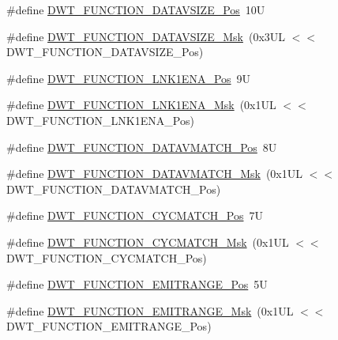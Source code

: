 \begin{DoxyCompactItemize}
\item 
\#define \hyperlink{group___c_m_s_i_s___d_w_t_ga0517a186d4d448aa6416440f40fe7a4d}{D\+W\+T\+\_\+\+F\+U\+N\+C\+T\+I\+O\+N\+\_\+\+D\+A\+T\+A\+V\+S\+I\+Z\+E\+\_\+\+Pos}~10U
\item 
\#define \hyperlink{group___c_m_s_i_s___d_w_t_gaab42cbc1e6084c44d5de70971613ea76}{D\+W\+T\+\_\+\+F\+U\+N\+C\+T\+I\+O\+N\+\_\+\+D\+A\+T\+A\+V\+S\+I\+Z\+E\+\_\+\+Msk}~(0x3\+U\+L $<$$<$ D\+W\+T\+\_\+\+F\+U\+N\+C\+T\+I\+O\+N\+\_\+\+D\+A\+T\+A\+V\+S\+I\+Z\+E\+\_\+\+Pos)
\item 
\#define \hyperlink{group___c_m_s_i_s___d_w_t_ga89d7c48858b4d4de96cdadfac91856a1}{D\+W\+T\+\_\+\+F\+U\+N\+C\+T\+I\+O\+N\+\_\+\+L\+N\+K1\+E\+N\+A\+\_\+\+Pos}~9U
\item 
\#define \hyperlink{group___c_m_s_i_s___d_w_t_ga64bd419260c3337cacf93607d1ad27ac}{D\+W\+T\+\_\+\+F\+U\+N\+C\+T\+I\+O\+N\+\_\+\+L\+N\+K1\+E\+N\+A\+\_\+\+Msk}~(0x1\+U\+L $<$$<$ D\+W\+T\+\_\+\+F\+U\+N\+C\+T\+I\+O\+N\+\_\+\+L\+N\+K1\+E\+N\+A\+\_\+\+Pos)
\item 
\#define \hyperlink{group___c_m_s_i_s___d_w_t_ga106f3672cd4be7c7c846e20497ebe5a6}{D\+W\+T\+\_\+\+F\+U\+N\+C\+T\+I\+O\+N\+\_\+\+D\+A\+T\+A\+V\+M\+A\+T\+C\+H\+\_\+\+Pos}~8U
\item 
\#define \hyperlink{group___c_m_s_i_s___d_w_t_ga32af1f1c0fcd2d8d9afd1ad79cd9970e}{D\+W\+T\+\_\+\+F\+U\+N\+C\+T\+I\+O\+N\+\_\+\+D\+A\+T\+A\+V\+M\+A\+T\+C\+H\+\_\+\+Msk}~(0x1\+U\+L $<$$<$ D\+W\+T\+\_\+\+F\+U\+N\+C\+T\+I\+O\+N\+\_\+\+D\+A\+T\+A\+V\+M\+A\+T\+C\+H\+\_\+\+Pos)
\item 
\#define \hyperlink{group___c_m_s_i_s___d_w_t_ga4b65d79ca37ae8010b4a726312413efd}{D\+W\+T\+\_\+\+F\+U\+N\+C\+T\+I\+O\+N\+\_\+\+C\+Y\+C\+M\+A\+T\+C\+H\+\_\+\+Pos}~7U
\item 
\#define \hyperlink{group___c_m_s_i_s___d_w_t_ga8e2ed09bdd33a8f7f7ce0444f5f3bb25}{D\+W\+T\+\_\+\+F\+U\+N\+C\+T\+I\+O\+N\+\_\+\+C\+Y\+C\+M\+A\+T\+C\+H\+\_\+\+Msk}~(0x1\+U\+L $<$$<$ D\+W\+T\+\_\+\+F\+U\+N\+C\+T\+I\+O\+N\+\_\+\+C\+Y\+C\+M\+A\+T\+C\+H\+\_\+\+Pos)
\item 
\#define \hyperlink{group___c_m_s_i_s___d_w_t_ga41d5b332216baa8d29561260a1b85659}{D\+W\+T\+\_\+\+F\+U\+N\+C\+T\+I\+O\+N\+\_\+\+E\+M\+I\+T\+R\+A\+N\+G\+E\+\_\+\+Pos}~5U
\item 
\#define \hyperlink{group___c_m_s_i_s___d_w_t_gad46dd5aba29f2e28d4d3f50b1d291f41}{D\+W\+T\+\_\+\+F\+U\+N\+C\+T\+I\+O\+N\+\_\+\+E\+M\+I\+T\+R\+A\+N\+G\+E\+\_\+\+Msk}~(0x1\+U\+L $<$$<$ D\+W\+T\+\_\+\+F\+U\+N\+C\+T\+I\+O\+N\+\_\+\+E\+M\+I\+T\+R\+A\+N\+G\+E\+\_\+\+Pos)
$$
\end{DoxyCompactItemize}
